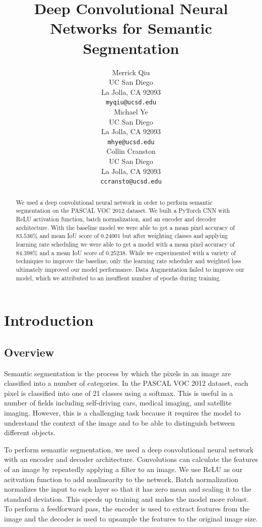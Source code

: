 \documentclass{article}
\title{Deep Convolutional Neural Networks for Semantic Segmentation}
\author{
  Merrick Qiu\\
  UC San Diego\\
  La Jolla, CA 92093 \\
  \texttt{myqiu@ucsd.edu} \\
  \And
  Michael Ye \\
  UC San Diego \\
  La Jolla, CA 92093 \\
  \texttt{mhye@ucsd.edu} \\
  \AND
  Collin Cranston \\
  UC San Diego \\
  La Jolla, CA 92093 \\
  \texttt{ccransto@ucsd.edu} \\
}
\begin{document}
\maketitle


\begin{abstract}
  We used a deep convolutional neural network in order to perform semantic segmentation on
  the PASCAL VOC 2012 dataset. 
  We built a PyTorch CNN with ReLU activation function, batch normalization, and an encoder and decoder architecture.
  With the baseline model we were able to get a mean pixel accuracy of $83.536\%$ and mean IoU score of $0.24001$ but after 
  weighting classes and applying learning rate scheduling
  we were able to get a model with a mean pixel accuracy of $84.398\%$ and a mean IoU score of $0.25238$.
  While we experimented with a variety of techniques to improve the baseline, only the
  learning rate scheduler and weighted loss ultimately improved our model performance. Data Augmentation failed
  to improve our model, which we attributed to an insuffient number of epochs during training.
\end{abstract}


\section{Introduction}
\subsection{Overview}
Semantic segmentation is the process by which the pixels in an image are classified into a number of categories.
In the PASCAL VOC 2012 dataset, each pixel is classified into one of 21 classes using a softmax.
This is useful in a number of fields including self-driving cars, medical imaging, and satellite imaging.
However, this is a challenging task because it requires the model to understand the context of the image and to be able to
distinguish between different objects. 

To perform semantic segmentation, we used a deep convolutional neural network with an encoder and decoder architecture.
Convolutions can calculate the features of an image by repeatedly applying a filter to an image.
We use ReLU as our acitvation function to add nonlinearity to the network. 
Batch normalization normalizes the input to each layer so that it has zero mean and scaling it to the standard deviation.
This speeds up training and makes the model more robust.
To perform a feedforward pass,
the encoder is used to extract features from the image and the decoder is used to upsample the features to the original image size.
\end{document}
